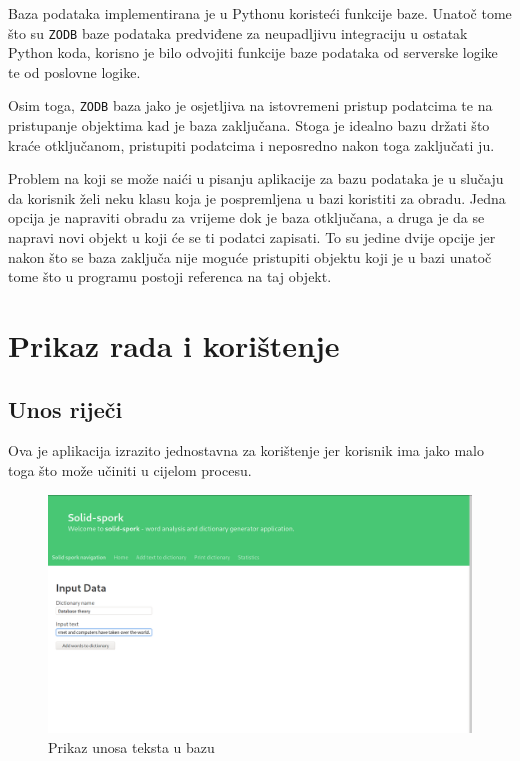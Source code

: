 \documentclass{foi}
\begin{document}
Baza podataka implementirana je u Pythonu koristeći funkcije baze. Unatoč tome
što su \texttt{ZODB} baze podataka predviđene za neupadljivu integraciju u
ostatak Python koda, korisno je bilo odvojiti funkcije baze podataka od
serverske logike te od poslovne logike.

Osim toga, \texttt{ZODB} baza jako je osjetljiva na istovremeni pristup
podatcima te na pristupanje objektima kad je baza zaključana. Stoga je idealno
bazu držati što kraće otključanom, pristupiti podatcima i neposredno nakon toga
zaključati ju.

Problem na koji se može naići u pisanju aplikacije za bazu podataka je u
slučaju da korisnik želi neku klasu koja je pospremljena u bazi koristiti za
obradu. Jedna opcija je napraviti obradu za vrijeme dok je baza otključana, a
druga je da se napravi novi objekt u koji će se ti podatci zapisati. To su
jedine dvije opcije jer nakon što se baza zaključa nije moguće pristupiti
objektu koji je u bazi unatoč tome što u programu postoji referenca na taj
objekt.

\chapter{Prikaz rada i korištenje}

\section{Unos riječi}

Ova je aplikacija izrazito jednostavna za korištenje jer korisnik ima jako malo
toga što može učiniti u cijelom procesu.

\begin{figure}[!h]
	\includegraphics[width=\textwidth]{slike/solid-spork-input.png}
	\caption{Prikaz unosa teksta u bazu}
	\label{ht_unos}
\end{figure}
\end{document}
